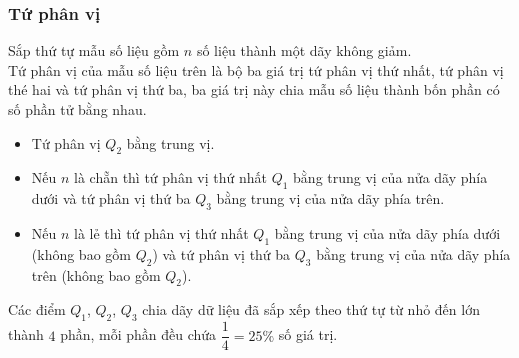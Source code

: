 \subsubsection{Tứ phân vị}
\begin{boxdn}
    Sắp thứ tự mẫu số liệu gồm $n$ số liệu thành một dãy không giảm.\\
    Tứ phân vị của mẫu số liệu trên là bộ ba giá trị tứ phân vị thứ nhất, tứ phân vị thé hai và tứ phân vị thứ ba, ba giá trị này chia mẫu số liệu thành bốn phần có số phần tử bằng nhau.
    \begin{itemize}
        \item Tứ phân vị $Q_2$ bằng trung vị.
        \item Nếu $n$ là chẵn thì tứ phân vị thứ nhất $Q_1$ bằng trung vị của nửa dãy phía dưới và tứ phân vị thứ ba $Q_3$ bằng trung vị của nửa dãy phía trên.
        \item Nếu $n$ là lẻ thì tứ phân vị thứ nhất $Q_1$ bằng trung vị của nửa dãy phía dưới (không bao gồm $Q_2$) và tứ phân vị thứ ba $Q_3$ bằng trung vị của nửa dãy phía trên (không bao gồm $Q_2$).
    \end{itemize}
\end{boxdn}
Các điểm $Q_1$, $Q_2$, $Q_3$ chia dãy dữ liệu đã sắp xếp theo thứ tự từ nhỏ đến lớn thành $4$ phần, mỗi phần đều chứa $\dfrac14=25\%$ số giá trị.

